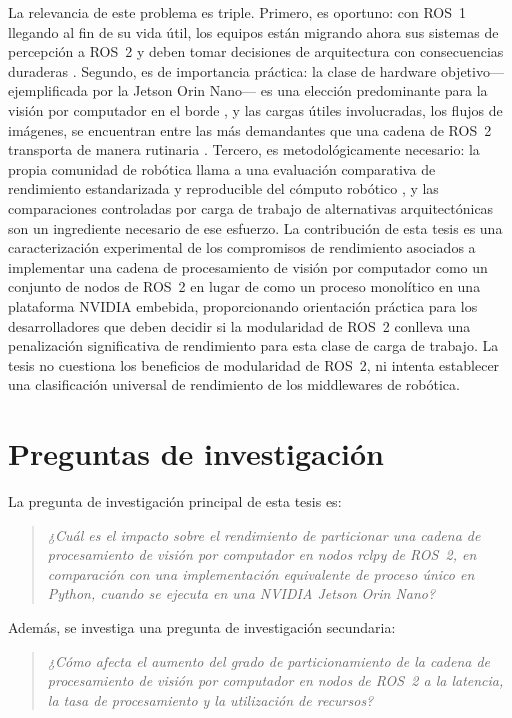 La relevancia de este problema es triple. Primero, es oportuno: con ROS~1
llegando al fin de su vida útil, los equipos están migrando ahora sus
sistemas de percepción a ROS~2 y deben tomar decisiones de arquitectura con
consecuencias duraderas \cite{portugal2025}. Segundo, es de importancia
práctica: la clase de hardware objetivo---ejemplificada por la Jetson Orin
Nano--- es una elección predominante para la visión por computador en el
borde \cite{scalcon2024, alqahtani2026}, y las cargas útiles involucradas,
los flujos de imágenes, se encuentran entre las más demandantes que una
cadena de ROS~2 transporta de manera rutinaria \cite{kamiya2025,
macenski2023}. Tercero, es metodológicamente necesario: la propia comunidad
de robótica llama a una evaluación comparativa de rendimiento estandarizada
y reproducible del cómputo robótico \cite{mayoral-vilches2024}, y las
comparaciones controladas por carga de trabajo de alternativas
arquitectónicas son un ingrediente necesario de ese esfuerzo. La
contribución de esta tesis es una caracterización experimental de los
compromisos de rendimiento asociados a implementar una cadena de
procesamiento de visión por computador como un conjunto de nodos de ROS~2 en
lugar de como un proceso monolítico en una plataforma NVIDIA embebida,
proporcionando orientación práctica para los desarrolladores que deben
decidir si la modularidad de ROS~2 conlleva una penalización significativa
de rendimiento para esta clase de carga de trabajo. La tesis no cuestiona
los beneficios de modularidad de ROS~2, ni intenta establecer una
clasificación universal de rendimiento de los middlewares de robótica.

\section{Preguntas de investigación}
\label{sec:research-questions}

La pregunta de investigación principal de esta tesis es:

\begin{quote}
\emph{¿Cuál es el impacto sobre el rendimiento de particionar una cadena de
procesamiento de visión por computador en nodos rclpy de ROS~2, en
comparación con una implementación equivalente de proceso único en Python,
cuando se ejecuta en una NVIDIA Jetson Orin Nano?}
\end{quote}

Además, se investiga una pregunta de investigación secundaria:

\begin{quote}
\emph{¿Cómo afecta el aumento del grado de particionamiento de la cadena de
procesamiento de visión por computador en nodos de ROS~2 a la latencia, la
tasa de procesamiento y la utilización de recursos?}
\end{quote}

